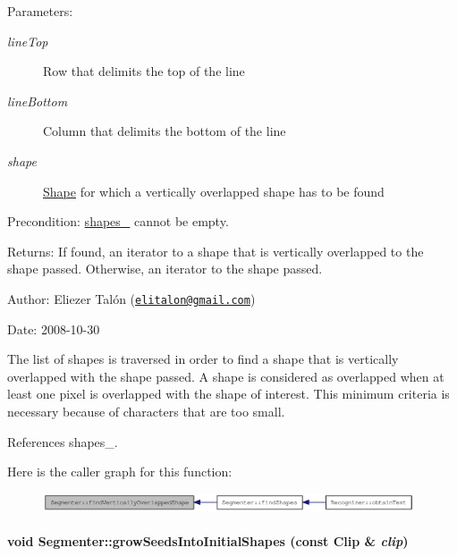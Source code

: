 \begin{Desc}
\item[Parameters:]
\begin{description}
\item[{\em lineTop}]Row that delimits the top of the line \item[{\em lineBottom}]Column that delimits the bottom of the line \item[{\em shape}]\hyperlink{class_shape}{Shape} for which a vertically overlapped shape has to be found\end{description}
\end{Desc}
\begin{Desc}
\item[Precondition:]\hyperlink{class_segmenter_41b94ede2829063e0937dc150756e77e}{shapes\_\-} cannot be empty.\end{Desc}
\begin{Desc}
\item[Returns:]If found, an iterator to a shape that is vertically overlapped to the shape passed. Otherwise, an iterator to the shape passed.\end{Desc}
\begin{Desc}
\item[Author:]Eliezer Talón (\href{mailto:elitalon@gmail.com}{\tt elitalon@gmail.com}) \end{Desc}
\begin{Desc}
\item[Date:]2008-10-30\end{Desc}
The list of shapes is traversed in order to find a shape that is vertically overlapped with the shape passed. A shape is considered as overlapped when at least one pixel is overlapped with the shape of interest. This minimum criteria is necessary because of characters that are too small. 

References shapes\_\-.

Here is the caller graph for this function:\nopagebreak
\begin{figure}[H]
\begin{center}
\leavevmode
\includegraphics[width=311pt]{class_segmenter_0961de0db6a0b1de51882024bfc830a1_icgraph}
\end{center}
\end{figure}
\hypertarget{class_segmenter_72c007e345fad7abbf6e9d4edb615a50}{
\paragraph[{growSeedsIntoInitialShapes}]{\setlength{\rightskip}{0pt plus 5cm}void Segmenter::growSeedsIntoInitialShapes (const {\bf Clip} \& {\em clip})}\hfill}
\label{class_segmenter_72c007e345fad7abbf6e9d4edb615a50}


